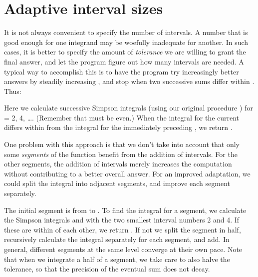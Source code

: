 \section{Adaptive interval sizes}

It is not always convenient to specify the number 
of intervals.  A number that is good enough for
one integrand may be woefully inadequate for another.  In
such cases, it is better to specify the amount of
{\it tolerance\/}  we are willing to grant the final answer, and let
the program figure out how many intervals are needed.  A
typical way to accomplish this is to have the program
try increasingly better answers by steadily increasing
, and stop when two successive sums differ within
.  Thus:


\n Here we calculate successive Simpson integrals (using
our original procedure ) for
 = 2, 4, \dots.  (Remember that  must be even.)
When the integral  for the current 
differs within  from the integral  for
the immediately preceding , we return .
                                               
One problem with this approach is that we don't take
into account that only some {\it segments\/} of the
function benefit from the addition of intervals.  For
the other segments, the addition of intervals merely
increases the computation without contributing to a
better overall answer.  For an improved adaptation, we
could split the integral into adjacent segments, and
improve each segment separately.


\n The initial segment is from  to .  To find
the integral for a segment, we calculate the Simpson
integrals  and  with the two smallest
interval numbers 2 and 4.  If these are within  of
each other, we return .  If not we split the
segment in half, recursively calculate the integral
separately for each segment, and add.  In
general, different segments at the same level converge
at their own pace.  Note that when we integrate a half
of a segment, we take care to also halve the tolerance,
so that the precision of the eventual sum does not
decay.

